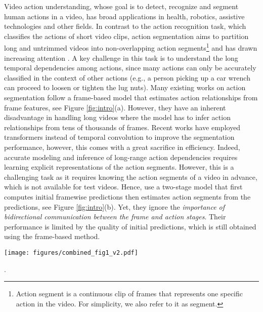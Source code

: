 \documentclass[10pt,twocolumn,letterpaper]{article}
\newcommand{\0}{\boldsymbol{0}}
\begin{document}
Video action understanding, whose goal is to detect, recognize and segment human actions in a video, has broad applications in health, robotics, assistive technologies and other fields. 
In contrast to the action recognition task, which classifies the actions of short video clips, action segmentation aims to partition long and untrimmed videos into non-overlapping action segments\footnote{Action segment is a continuous clip of frames that represents one specific action in the video. For simplicity, we also refer to it as segment.} and has drawn increasing attention \cite{Farha:CVPR19,Li:TPAMI20,Huang:CVPR20,Ishikawa:WACV21,Yi:BMVC21,Dipika:Arxiv21,Ahn:ICCV21,Souri:PAMI21,Zhang:Arxiv22,Behrmann:ECCV22}.
A key challenge in this task is to understand the long temporal dependencies among actions, 
since many actions can only be accurately classified in the context of other actions (e.g., a person picking up a car wrench can proceed to loosen or tighten the lug nuts). 
Many existing works on action segmentation \cite{Farha:CVPR19,Li:TPAMI20,Ishikawa:WACV21,Yi:BMVC21,Dipika:Arxiv21} follow a frame-based model that estimates action relationships from frame features, see Figure \ref{fig:intro}(a). However, they have an inherent disadvantage in handling long videos where the model has to infer action relationships from tens of thousands of frames. 
Recent works \cite{Yi:BMVC21,Wang:Arxiv22} have employed transformers \cite{Vaswani:NIPS17} instead of temporal convolution \cite{Farha:CVPR19} to improve the segmentation performance, however, this comes with a great sacrifice in efficiency. 
Indeed, accurate modeling and inference of long-range action dependencies requires learning explicit representations of the action segments. However, this is a challenging task as it requires knowing the action segments of a video in advance, which is not available for test videos. Hence, \cite{Huang:CVPR20,Ahn:ICCV21,Behrmann:ECCV22} use a two-stage model that first computes initial framewise predictions then estimates action segments from the predictions, see Figure \ref{fig:intro}(b). 
Yet, they ignore the \textit{importance of bidirectional communication between the frame and action stages}. Their performance is limited by the quality of initial predictions, which is still obtained using the frame-based method.


\begin{figure*}
   \centering
   \texttt{[image: figures/combined\_fig1\_v2.pdf]}
   \caption{\small (a-c) \textbf{Architectures of prior and our methods}. (d) \textbf{Performance vs Inference Time} on Breakfast dataset: BIT outperforms prior methods while being \textit{30 times faster} than the previous best method (UVAST)}.
   \label{fig:intro}
   \vspace{-3mm}
\end{figure*}
\end{document}
